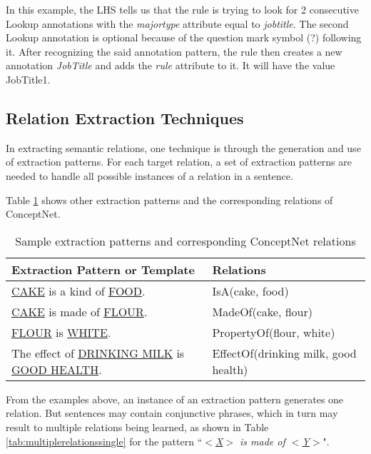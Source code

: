 In this example, the LHS tells us that the rule is trying to look for 2 consecutive Lookup annotations with the \textit{majortype} attribute equal to \textit{jobtitle}. The second Lookup annotation is optional because of the question mark symbol (?) following it. After recognizing the said annotation pattern, the rule then creates a new annotation \textit{JobTitle} and adds the \textit{rule} attribute to it. It will have the value JobTitle1.

\subsection{Relation Extraction Techniques}
\label{sec:relextraction}

In extracting semantic relations, one technique is through the generation and use of extraction patterns. For each target relation, a set of extraction patterns are needed to handle all possible instances of a relation in a sentence.

Table \ref{tab:patternsamples} shows other extraction patterns and the corresponding relations of ConceptNet.

\begin{table}[ht]   %
\centering
\caption{Sample extraction patterns and corresponding ConceptNet relations} \vspace{0.25em}
\begin{tabular}{|p{7cm}|l|} \hline
Extraction Pattern or Template & Relations \\ \hline
\underline{CAKE} is a kind of \underline{FOOD}. & IsA(cake, food) \\ \hline
\underline{CAKE} is made of \underline{FLOUR}. & MadeOf(cake, flour) \\ \hline
\underline{FLOUR} is \underline{WHITE}. & PropertyOf(flour, white) \\ \hline
The effect of \underline{DRINKING MILK} is \underline{GOOD HEALTH}. & EffectOf(drinking milk, good health) \\ \hline
\end{tabular}
\label{tab:patternsamples}
\end{table}

From the examples above, an instance of an extraction pattern generates one relation. But sentences may contain conjunctive phrases, which in turn may result to multiple relations being learned, as shown in Table \ref{tab:multiplerelationssingle} for the pattern ``\textit{\underline{$<$X$>$} is made of \underline{$<$Y$>$}}".

